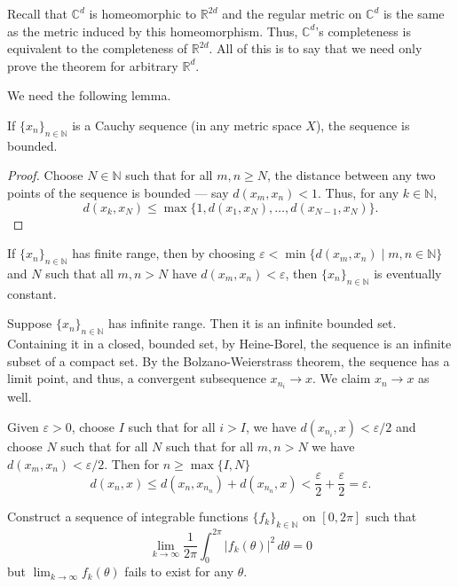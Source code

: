 \documentclass[12 pt, letterpaper]{hmcpset}
\begin{document}
\begin{solution}
	Recall that $\mathbb{C}^{d}$ is homeomorphic to $\mathbb{R}^{2d}$ and the regular metric on $\mathbb{C}^{d}$ is the same as the metric induced by this homeomorphism. Thus, $\mathbb{C}^{d}$'s completeness is equivalent to the completeness of $\mathbb{R}^{2d}$. All of this is to say that we need only prove the theorem for arbitrary $\mathbb{R}^{d}$.

	We need the following lemma.
	\begin{lemma}
		If $\{ x_{n} \}_{n \in \mathbb{N}}$ is a Cauchy sequence (in any metric space $X$), the sequence is bounded.
	\end{lemma}
	\begin{proof}
		Choose $N \in \mathbb{N}$ such that for all $m, n \ge N$, the distance between any two points of the sequence is bounded --- say $d(x_{m}, x_{n}) < 1$. Thus, for any $k \in \mathbb{N}$,
		\[
			d(x_{k}, x_{N}) \le \max \{ 1, d(x_{1}, x_{N}), \dots, d(x_{N - 1}, x_{N}) \}.
		\]
	\end{proof}

	If $\{ x_{n} \}_{n \in \mathbb{N}}$ has finite range, then by choosing $\varepsilon < \min \{ d(x_{m}, x_{n}) \mid m, n \in \mathbb{N} \}$ and $N$ such that all $m, n > N$ have $d(x_{m}, x_{n}) < \varepsilon$, then $\{ x_{n} \}_{n \in \mathbb{N}}$ is eventually constant.

	Suppose $\{ x_{n} \}_{n \in \mathbb{N}}$ has infinite range. Then it is an infinite bounded set. Containing it in a closed, bounded set, by Heine-Borel, the sequence is an infinite subset of a compact set. By the Bolzano-Weierstrass theorem, the sequence has a limit point, and thus, a convergent subsequence $x_{n_{i}} \to x$. We claim $x_{n} \to x$ as well.

	Given $\varepsilon > 0$, choose $I$ such that for all $i > I$, we have $d(x_{n_{i}}, x) < \varepsilon /2$ and choose $N$ such that for all $N$ such that for all $m, n > N$ we have  $d(x_{m}, x_{n}) < \varepsilon/2$. Then for $n \ge \max \{ I, N \}$
$$
d(x_{n}, x) \le d(x_{n}, x_{n_{n}}) + d(x_{n_{n}}, x) < \frac{\varepsilon}{2} + \frac{\varepsilon}{2} = \varepsilon.
$$
\end{solution}

\pagebreak

\begin{problem}[S \& S \S 3.3 \#3.]
	Construct a sequence of integrable functions $\{ f_{k} \}_{k \in \mathbb{N}}$ on $[0, 2\pi]$ such that
	\[
		\lim_{k \to \infty} \frac{1}{2 \pi} \int_{0}^{2 \pi} \lvert f_{k}(\theta) \rvert^{2} \, d\theta = 0
	\]
	but $\lim_{k \to \infty} f_{k}(\theta)$ fails to exist for any $\theta$.
\end{problem}
\end{document}
